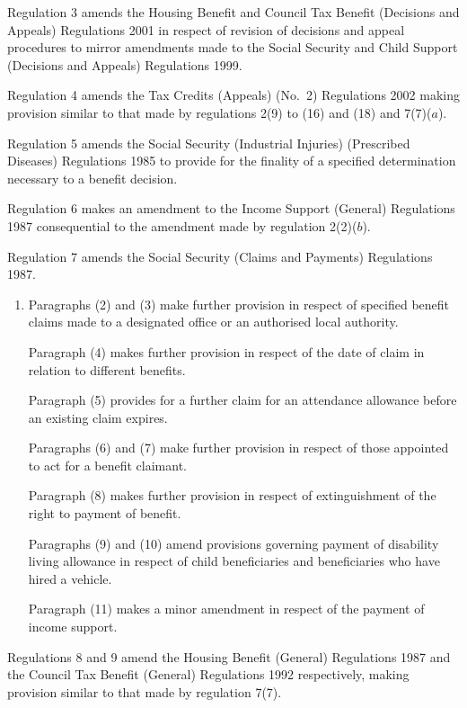 \documentclass[12pt,a4paper]{article}
\begin{document}
Regulation 3 amends the Housing Benefit and Council Tax Benefit (Decisions and Appeals) Regulations 2001 in respect of revision of decisions and appeal procedures to mirror amendments made to the Social Security and Child Support (Decisions and Appeals) Regulations 1999.

Regulation 4 amends the Tax Credits (Appeals) (No.\ 2) Regulations 2002 making provision similar to that made by regulations 2(9) to (16) and (18) and 7(7)($a$).

Regulation 5 amends the Social Security (Industrial Injuries) (Prescribed Diseases) Regulations 1985 to provide for the finality of a specified determination necessary to a benefit decision.

Regulation 6 makes an amendment to the Income Support (General) Regulations 1987 consequential to the amendment made by regulation 2(2)($b$).

Regulation 7 amends the Social Security (Claims and Payments) Regulations 1987.
\begin{enumerate}\item[]
    Paragraphs (2) and (3) make further provision in respect of specified benefit claims made to a designated office or an authorised local authority.

    Paragraph (4) makes further provision in respect of the date of claim in relation to different benefits.

    Paragraph (5) provides for a further claim for an attendance allowance before an existing claim expires.

    Paragraphs (6) and (7) make further provision in respect of those appointed to act for a benefit claimant.

    Paragraph (8) makes further provision in respect of extinguishment of the right to payment of benefit.

    Paragraphs (9) and (10) amend provisions governing payment of disability living allowance in respect of child beneficiaries and beneficiaries who have hired a vehicle.

    Paragraph (11) makes a minor amendment in respect of the payment of income support. 
\end{enumerate}

Regulations 8 and 9 amend the Housing Benefit (General) Regulations 1987 and the Council Tax Benefit (General) Regulations 1992 respectively, making provision similar to that made by regulation 7(7).
\end{document}
